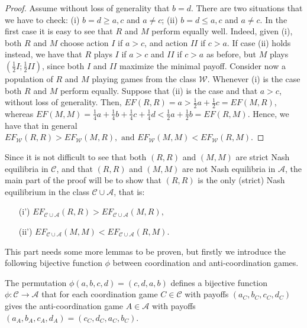 \documentclass[fleqn,reqno,11pt]{article}
\begin{document}
\begin{proof}
Assume without loss of generality that $b=d$. There are two situations that we have to check: (i) $b=d \geq a,c$ and $ a \neq c $; (ii) $b=d \leq a,c$ and $ a \neq c $.
In the first case it
is easy to see that $R$ and $M$ perform equally well. Indeed, given
(i), both $R$ and $M$ choose action $I$ if $a>c$, and action $II$
if $c>a$. If case (ii) holds instead, we have that $R$ plays $I$
if $a>c$ and $II$ if $c>a$ as before, but $M$ plays $(\frac{1}{2}I;\frac{1}{2}II)$,
since both $I$ and $II$ maximize the minimal payoff. Consider now
a population of $R$ and $M$ playing games from the class $\mathcal{W}$.
Whenever (i) is the case both $R$ and $M$ perform equally. Suppose that
(ii) is the case and that $a>c$, without loss of generality. Then,  $EF(R,R)=a>\frac{1}{2}a+\frac{1}{2}c=EF(M,R)$, whereas $EF(M,M)=\frac{1}{4}a+\frac{1}{4}b+\frac{1}{4}c+\frac{1}{4}d<\frac{1}{2}a+\frac{1}{2}b=EF(R,M)$.
Hence, we have that in general $EF_{\mathcal{W}}(R,R)>EF_{\mathcal{W}}(M,R),\mbox{ and }EF_{\mathcal{W}}(M,M)<EF_{\mathcal{W}}(R,M)$.
\end{proof}

\medskip{}


Since it is not difficult to see that both $(R,R)$ and $(M,M)$ are strict Nash equilibria in $\mathcal{C}$, and that $(R,R)$ and $(M,M)$ are not Nash equilibria in $\mathcal{A}$, the main part of
the proof will be to show that $(R,R)$ is the only (strict) Nash equilibrium in the class $\mathcal{C}\cup\mathcal{A}$, that is:
\begin{itemize}
\item[(i')] $EF_{\mathcal{C}\cup\mathcal{A}}(R,R)>EF_{\mathcal{C}\cup\mathcal{A}}(M,R),$
\item[(ii')] $EF_{\mathcal{C}\cup\mathcal{A}}(M,M)<EF_{\mathcal{C}\cup\mathcal{A}}(R,M).$
\end{itemize}


\noindent This part needs some more lemmas to be proven, but firstly we introduce
the following bijective function $\phi$ between coordination and
anti-coordination games.

\medskip{}

\begin{definition}[$\phi$] \label{def:bijection phi}
The permutation $\phi(a,b,c,d)=(c,d,a,b)$ defines a bijective function $\phi:\mathcal{C}\rightarrow\mathcal{A}$ that for each
coordination game $C\in\mathcal{C}$ with payoffs $(a_{C},b_{C},c_{C},d_{C})$
gives the anti-coordination game $A\in\mathcal{A}$ with payoffs
$(a_{A},b_{A},c_{A},d_{A})=(c_{C},d_{C},a_{C},b_{C})$.
\end{definition}
\end{document}
